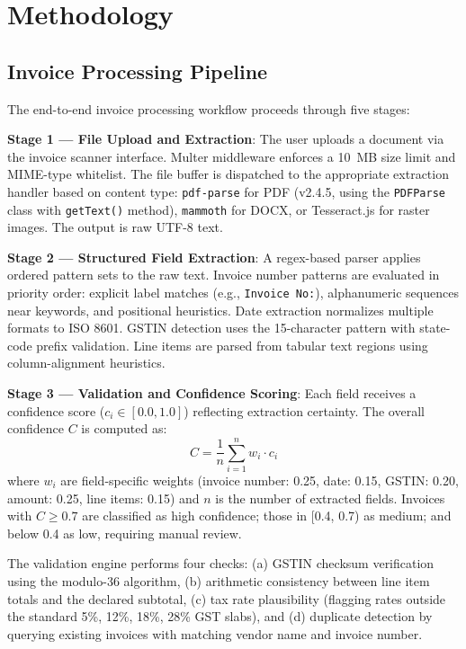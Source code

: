 \documentclass[conference]{IEEEtran}
\begin{document}
\section{Methodology}

\subsection{Invoice Processing Pipeline}
The end-to-end invoice processing workflow proceeds through five stages:

\textbf{Stage 1 — File Upload and Extraction}: The user uploads a document via the invoice scanner interface. Multer middleware enforces a 10~MB size limit and MIME-type whitelist. The file buffer is dispatched to the appropriate extraction handler based on content type: \texttt{pdf-parse} for PDF (v2.4.5, using the \texttt{PDFParse} class with \texttt{getText()} method), \texttt{mammoth} for DOCX, or Tesseract.js for raster images. The output is raw UTF-8 text.

\textbf{Stage 2 — Structured Field Extraction}: A regex-based parser applies ordered pattern sets to the raw text. Invoice number patterns are evaluated in priority order: explicit label matches (e.g., \texttt{Invoice No:}), alphanumeric sequences near keywords, and positional heuristics. Date extraction normalizes multiple formats to ISO 8601. GSTIN detection uses the 15-character pattern with state-code prefix validation. Line items are parsed from tabular text regions using column-alignment heuristics.

\textbf{Stage 3 — Validation and Confidence Scoring}: Each field receives a confidence score ($c_i \in [0.0, 1.0]$) reflecting extraction certainty. The overall confidence $C$ is computed as:
\begin{equation}
C = \frac{1}{n} \sum_{i=1}^{n} w_i \cdot c_i
\end{equation}
where $w_i$ are field-specific weights (invoice number: 0.25, date: 0.15, GSTIN: 0.20, amount: 0.25, line items: 0.15) and $n$ is the number of extracted fields. Invoices with $C \geq 0.7$ are classified as high confidence; those in [0.4, 0.7) as medium; and below 0.4 as low, requiring manual review.

The validation engine performs four checks: (a) GSTIN checksum verification using the modulo-36 algorithm, (b) arithmetic consistency between line item totals and the declared subtotal, (c) tax rate plausibility (flagging rates outside the standard 5\%, 12\%, 18\%, 28\% GST slabs), and (d) duplicate detection by querying existing invoices with matching vendor name and invoice number.
\end{document}
